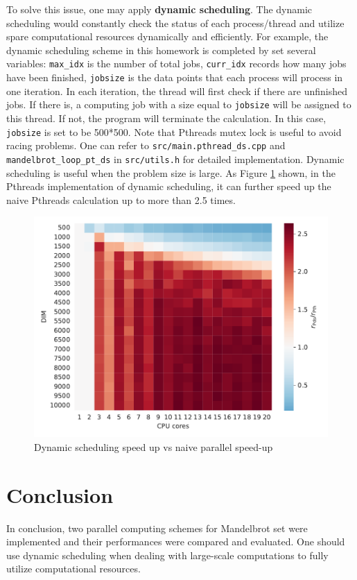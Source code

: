 \documentclass[twoside,12pt]{article}
\theoremstyle{definition}
\theoremstyle{remark}
\begin{document}
To solve this issue, one may apply \textbf{dynamic scheduling}.
The dynamic scheduling would constantly check the status of each process/thread
and utilize spare computational resources dynamically and efficiently.
For example, the dynamic scheduling scheme in this homework is completed by
set several variables: \lstinline|max_idx| is the number of total jobs,
\lstinline|curr_idx| records how many jobs have been finished, 
\lstinline|jobsize| is the data points that each process will process in 
one iteration.
In each iteration, the thread will first check if there are unfinished
jobs. If there is, a computing job with a size equal to \lstinline|jobsize|
will be assigned to this thread.
If not, the program will terminate the calculation.
In this case, \lstinline|jobsize| is set to be 500*500.
Note that Pthreads mutex lock is useful to avoid racing problems.
One can refer to \lstinline|src/main.pthread_ds.cpp| and
\lstinline|mandelbrot_loop_pt_ds| in \lstinline|src/utils.h| for detailed implementation.
Dynamic scheduling is useful when the problem size is large.
As Figure \ref{fig:ds} shown, in the Pthreads implementation of dynamic
scheduling, it can further speed up the naive Pthreads
calculation up to more than 2.5 times.

\begin{figure}[h!]
    \centering
    \includegraphics[width=\textwidth]{../analysis/pds2pth.pdf}
    \caption{Dynamic scheduling speed up vs naive parallel speed-up}
    \label{fig:ds}
\end{figure}




\section{Conclusion}
In conclusion, two parallel computing schemes for Mandelbrot set were implemented and
their performances were compared and evaluated.
One should use dynamic scheduling when dealing with large-scale computations
to fully utilize computational resources.
\end{document}

